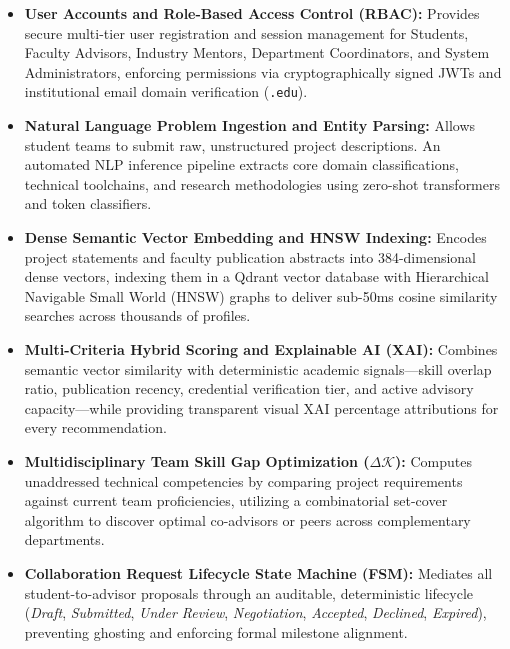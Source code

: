\begin{itemize}[label=\textbf{\tiny\ensuremath{\blacksquare}}]
    \item \textbf{User Accounts and Role-Based Access Control (RBAC):} Provides secure multi-tier user registration and session management for Students, Faculty Advisors, Industry Mentors, Department Coordinators, and System Administrators, enforcing permissions via cryptographically signed JWTs and institutional email domain verification (\texttt{.edu}).
    
    \item \textbf{Natural Language Problem Ingestion and Entity Parsing:} Allows student teams to submit raw, unstructured project descriptions. An automated NLP inference pipeline extracts core domain classifications, technical toolchains, and research methodologies using zero-shot transformers and token classifiers.
    
    \item \textbf{Dense Semantic Vector Embedding and HNSW Indexing:} Encodes project statements and faculty publication abstracts into 384-dimensional dense vectors, indexing them in a Qdrant vector database with Hierarchical Navigable Small World (HNSW) graphs to deliver sub-50ms cosine similarity searches across thousands of profiles.
    
    \item \textbf{Multi-Criteria Hybrid Scoring and Explainable AI (XAI):} Combines semantic vector similarity with deterministic academic signals—skill overlap ratio, publication recency, credential verification tier, and active advisory capacity—while providing transparent visual XAI percentage attributions for every recommendation.
    
    \item \textbf{Multidisciplinary Team Skill Gap Optimization ($\Delta \mathcal{K}$):} Computes unaddressed technical competencies by comparing project requirements against current team proficiencies, utilizing a combinatorial set-cover algorithm to discover optimal co-advisors or peers across complementary departments.
    
    \item \textbf{Collaboration Request Lifecycle State Machine (FSM):} Mediates all student-to-advisor proposals through an auditable, deterministic lifecycle (\textit{Draft}, \textit{Submitted}, \textit{Under Review}, \textit{Negotiation}, \textit{Accepted}, \textit{Declined}, \textit{Expired}), preventing ghosting and enforcing formal milestone alignment.
    

\end{itemize}
